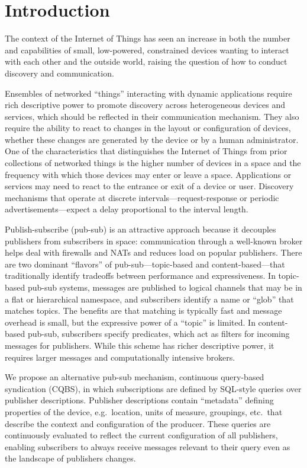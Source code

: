 \section{Introduction}

The context of the Internet of Things has seen an increase in both the number and capabilities of small, low-powered, constrained devices wanting to interact with each other and the outside world, raising the question of how to conduct discovery and communication.

Ensembles of networked ``things'' interacting with dynamic applications require rich descriptive power to promote discovery across heterogeneous devices and services, which should be reflected in their communication mechanism.
They also require the ability to react to changes in the layout or configuration of devices, whether these changes are generated by the device or by a human administrator.
One of the characteristics that distinguishes the Internet of Things from prior collections of networked things is the higher number of devices in a space and the frequency with which those devices may enter or leave a space.
Applications or services may need to react to the entrance or exit of a device or user.
Discovery mechanisms that operate at discrete intervals---request-response or periodic advertisements---expect a delay proportional to the interval length.

Publish-subscribe (pub-sub) is an attractive approach because it decouples publishers from subscribers in space: communication through a well-known broker helps deal with firewalls and NATs and reduces load on popular publishers.
There are two dominant ``flavors'' of pub-sub---topic-based and content-based---that traditionally identify tradeoffs between performance and expressiveness.
In topic-based pub-sub systems, messages are published to logical channels that may be in a flat or hierarchical namespace, and subscribers identify a name or ``glob'' that matches topics.
The benefits are that matching is typically fast and message overhead is small, but the expressive power of a ``topic'' is limited.
In content-based pub-sub, subscribers specify predicates, which act as filters for incoming messages for publishers.
While this scheme has richer descriptive power, it requires larger messages and computationally intensive brokers.

We propose an alternative pub-sub mechanism, continuous query-based syndication (CQBS), in which subscriptions are defined by SQL-style queries over publisher descriptions.
Publisher descriptions contain ``metadata'' defining properties of the device, e.g.\ location, units of measure, groupings, etc.\ that describe the context and configuration of the producer.
These queries are continuously evaluated to reflect the current configuration of all publishers, enabling subscribers to always receive messages relevant to their query even as the landscape of
publishers changes.

